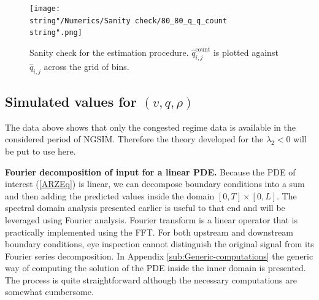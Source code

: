 \documentclass[preprint]{elsarticle}
\begin{document}
\begin{figure}[H]
\centering
\texttt{[image: \\string"/Numerics/Sanity check/80\_80\_q\_q\_count\\string".png]}
\protect\caption{Sanity check for the estimation procedure. $\widehat{q}_{i,j}^{\text{count}}$
is plotted against $\widehat{q}_{i,j}$ across the grid of bins.
\label{fig:Sanity-check}}
\end{figure}

\subsection{Simulated values for $\left(v,q,\rho\right)$}

The data above shows that only the congested regime data is available in the considered period of NGSIM. Therefore the theory developed for the $\lambda_{2}<0$
will be put to use here.

\textbf{Fourier decomposition of input for a linear PDE. } Because the PDE of interest (\eqref{ARZEq}) is linear, we can decompose boundary conditions into a sum and then adding
the predicted values inside the domain $\left[0,T\right]\times\left[0,L\right]$. The spectral domain analysis presented
earlier is useful to that end and will be leveraged using Fourier
analysis. Fourier transform is a linear operator that is practically
implemented using the FFT.
For both upstream and downstream boundary conditions,
eye inspection cannot distinguish the original signal from its Fourier
series decomposition. In Appendix \ref{sub:Generic-computations}
the generic way of computing the solution of the PDE inside the inner
domain is presented. The process is quite straightforward although
the necessary computations are somewhat cumbersome.
\end{document}
